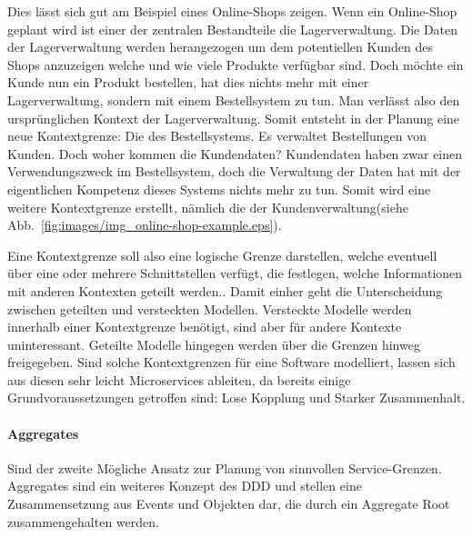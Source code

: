 \documentclass[12pt,a4paper,bibliography=totocnumbered,listof=totocnumbered]{scrartcl}
\begin{document}
Dies lässt sich gut am Beispiel eines Online-Shops zeigen. Wenn ein Online-Shop geplant wird ist einer der zentralen Bestandteile die Lagerverwaltung. Die Daten der Lagerverwaltung werden herangezogen um dem potentiellen Kunden des Shops anzuzeigen welche und wie viele Produkte verfügbar sind. Doch möchte ein Kunde nun ein Produkt bestellen, hat dies nichts mehr mit einer Lagerverwaltung, sondern mit einem Bestellsystem zu tun. Man verlässt also den ursprünglichen Kontext der Lagerverwaltung. Somit entsteht in der Planung eine neue Kontextgrenze: Die des Bestellsystems. Es verwaltet Bestellungen von Kunden. Doch woher kommen die Kundendaten? Kundendaten haben zwar einen Verwendungszweck im Bestellsystem, doch die Verwaltung der Daten hat mit der eigentlichen Kompetenz dieses Systems nichts mehr zu tun. Somit wird eine weitere Kontextgrenze erstellt, nämlich die der Kundenverwaltung(siehe Abb.~\ref{fig:images/img_online-shop-example.eps}).


Eine Kontextgrenze soll also eine logische Grenze darstellen, welche eventuell über eine oder mehrere Schnittstellen verfügt, die festlegen, welche Informationen mit anderen Kontexten geteilt werden.\cite[S.65]{buildingms}. Damit einher geht die Unterscheidung zwischen geteilten und versteckten Modellen. Versteckte Modelle werden innerhalb einer Kontextgrenze benötigt, sind aber für andere Kontexte uninteressant. Geteilte Modelle hingegen werden über die Grenzen hinweg freigegeben. Sind solche Kontextgrenzen für eine Software modelliert, lassen sich aus diesen sehr leicht Microservices ableiten, da bereits einige Grundvoraussetzungen getroffen sind: Lose Kopplung und Starker Zusammenhalt.\cite[S.68]{buildingms}


\paragraph{Aggregates}

Sind der zweite Mögliche Ansatz zur Planung von sinnvollen Service-Grenzen. Aggregates sind ein weiteres Konzept des \ac{DDD} und stellen eine Zusammensetzung aus Events und Objekten dar, die durch ein Aggregate Root zusammengehalten werden.
\end{document}
